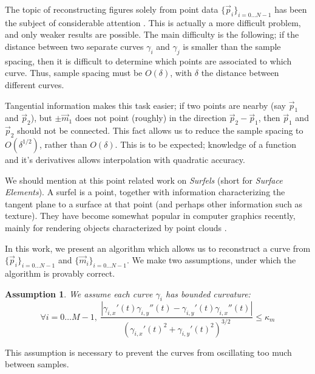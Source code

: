 \documentclass{article}
\newtheorem{assumption}{Assumption}
\numberwithin{cntr}{section}
\numberwithin{equation}{section}
\newcommand{\abs}[1]{\left| #1 \right|}%
\newcommand{\vp}[0]{{\vec{p}}}
\newcommand{\vm}[0]{{\vec{m}}}
\newcommand{\Oto}[1]{{0 \ldots #1-1}}
\newcommand{\OtoN}{{0 \ldots N-1}}
\newcommand{\pointData}{{ \{ \vp_{i} \}_{i=\OtoN} }}
\newcommand{\tanData}{{ \{ \vm_{i} \}_{i=\OtoN} }}
\newcommand{\curvemax}{{\kappa_{m}}}
\newcommand{\curvesep}{{\delta}}
\begin{document}
The topic of reconstructing figures solely from point data $\pointData$ has been the subject of considerable attention \cite{amenta98crust,amenta98new,dey99curve,hoppe92surface,amenta02simple, dey01reconstructing}. This is actually a more difficult problem, and only weaker results are possible. The main difficulty is the following; if the distance between two separate curves $\gamma_{i}$ and $\gamma_{j}$ is smaller than the sample spacing, then it is difficult to determine which points are associated to which curve. Thus, sample spacing must be $O(\curvesep)$, with $\curvesep$ the distance between different curves.

Tangential information makes this task easier; if two points are nearby (say $\vp_{1}$ and $\vp_{2}$), but $\pm \vm_{1}$ does not point (roughly) in the direction $\vp_{2}-\vp_{1}$, then $\vp_{1}$ and $\vp_{2}$ should not be connected. This fact allows us to reduce the sample spacing to $O(\curvesep^{1/2})$, rather than $O(\curvesep)$. This is to be expected; knowledge of a function and it's derivatives allows interpolation with quadratic accuracy.

We should mention at this point related work on \emph{Surfels} (short for \emph{Surface Elements}). A surfel is a point, together with information characterizing the tangent plane to a surface at that point (and perhaps other information such as texture). They have become somewhat popular in computer graphics recently, mainly for rendering objects characterized by point clouds \cite{882320,598521,344936,1018057,1103907,383300}.

In this work, we present an algorithm which allows us to reconstruct a curve from $\pointData$ and $\tanData$. We make two assumptions, under which the algorithm is provably correct.

\begin{assumption}
  \label{ass:curvature}
  We assume each curve $\gamma_{i}$ has bounded curvature:
  \begin{equation}
    \label{eq:curvatureAssumption}
    \forall i = \Oto{M}, ~ \frac{
      \abs{\gamma_{i,x}'(t) \gamma_{i,y}''(t) - \gamma_{i,y}'(t) \gamma_{i,x}''(t)}
    } {
      (\gamma_{i,x}'(t)^{2}+\gamma_{i,y}'(t)^{2})^{3/2}
    } \leq \curvemax
  \end{equation}
\end{assumption}

This assumption is necessary to prevent the curves from oscillating too much between samples.
\end{document}
